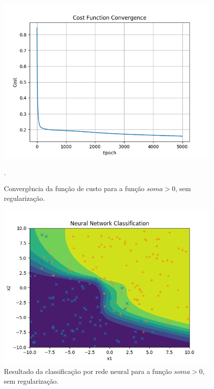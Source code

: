 \documentclass[conference]{IEEEtran}
\begin{document}
\begin{figure}[htbp]
\centering
\centerline{\includegraphics[scale=0.5]{imagens/sum_gt_zero/lambda_zero/convergence_sgz.png}}
\caption{Convergência da função de custo para a função $soma > 0$, sem regularização.}.
\label{sum_gt_zero/lambda_zero/convergence_sgz}
\end{figure}

\begin{figure}[htbp]
\centering
\centerline{\includegraphics[scale=0.5]{imagens/sum_gt_zero/lambda_zero/nn_classification_sgz.png}}
\caption{Resultado da classificação por rede neural para a função $soma > 0$, sem regularização.}
\label{sum_gt_zero/lambda_zero/nn_classification_sgz}
\end{figure}
\end{document}
